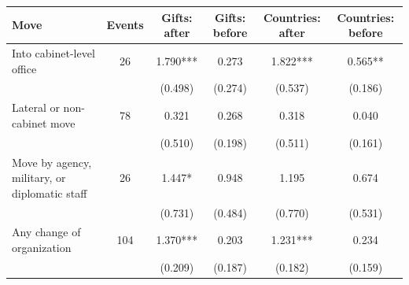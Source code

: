 \begin{tabular}{lccccc}
\toprule
Move & Events & Gifts: after & Gifts: before & Countries: after & Countries: before \\
\midrule
Into cabinet-level office & 26 & 1.790*** & 0.273 & 1.822*** & 0.565** \\
 &  & (0.498) & (0.274) & (0.537) & (0.186) \\
Lateral or non-cabinet move & 78 & 0.321 & 0.268 & 0.318 & 0.040 \\
 &  & (0.510) & (0.198) & (0.511) & (0.161) \\
Move by agency, military, or diplomatic staff & 26 & 1.447* & 0.948 & 1.195 & 0.674 \\
 &  & (0.731) & (0.484) & (0.770) & (0.531) \\
Any change of organization & 104 & 1.370*** & 0.203 & 1.231*** & 0.234 \\
 &  & (0.209) & (0.187) & (0.182) & (0.159) \\
\bottomrule
\end{tabular}

